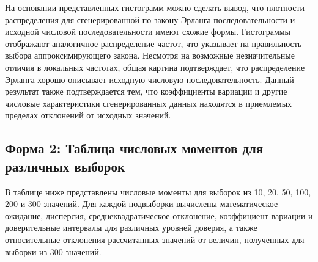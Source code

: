 На основании представленных гистограмм можно сделать вывод, что плотности распределения для сгенерированной по закону Эрланга последовательности и исходной числовой последовательности имеют схожие формы. Гистограммы отображают аналогичное распределение частот, что указывает на правильность выбора аппроксимирующего закона. Несмотря на возможные незначительные отличия в локальных частотах, общая картина подтверждает, что распределение Эрланга хорошо описывает исходную числовую последовательность. Данный результат также подтверждается тем, что коэффициенты вариации и другие числовые характеристики сгенерированных данных находятся в приемлемых пределах отклонений от исходных значений.

\subsection{Форма 2: Таблица числовых моментов для различных выборок}
В таблице ниже представлены числовые моменты для выборок из 10, 20, 50, 100, 200 и 300 значений. Для каждой подвыборки вычислены математическое ожидание, дисперсия, среднеквадратическое отклонение, коэффициент вариации и доверительные интервалы для различных уровней доверия, а также относительные отклонения рассчитанных значений от величин, полученных для выборки из 300 значений.

